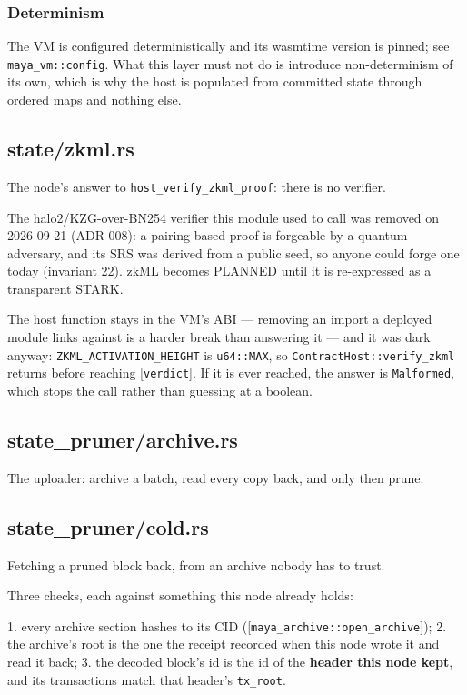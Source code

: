 \documentclass[11pt,a4paper]{article}
\begin{document}
\subsubsection{Determinism}

The VM is configured deterministically and its wasmtime version is pinned;
see \texttt{maya\_vm::config}. What this layer must not do is introduce
non-determinism of its own, which is why the host is populated from committed
state through ordered maps and nothing else.

\subsection{state/zkml.rs}
The node's answer to \texttt{host\_verify\_zkml\_proof}: there is no verifier.

The halo2/KZG-over-BN254 verifier this module used to call was removed on
2026-09-21 (ADR-008): a pairing-based proof is forgeable by a quantum
adversary, and its SRS was derived from a public seed, so anyone could
forge one today (invariant 22). zkML becomes PLANNED until it is
re-expressed as a transparent STARK.

The host function stays in the VM's ABI — removing an import a deployed
module links against is a harder break than answering it — and it was
dark anyway: \texttt{ZKML\_ACTIVATION\_HEIGHT} is \texttt{u64::MAX}, so
\texttt{ContractHost::verify\_zkml} returns before reaching [\texttt{verdict}]. If it is
ever reached, the answer is \texttt{Malformed}, which stops the call rather than
guessing at a boolean.

\subsection{state\_pruner/archive.rs}
The uploader: archive a batch, read every copy back, and only then prune.

\subsection{state\_pruner/cold.rs}
Fetching a pruned block back, from an archive nobody has to trust.

Three checks, each against something this node already holds:

1. every archive section hashes to its CID ([\texttt{maya\_archive::open\_archive}]);
2. the archive's root is the one the receipt recorded when this node wrote
   it and read it back;
3. the decoded block's id is the id of the \textbf{header this node kept}, and
   its transactions match that header's \texttt{tx\_root}.
\end{document}
